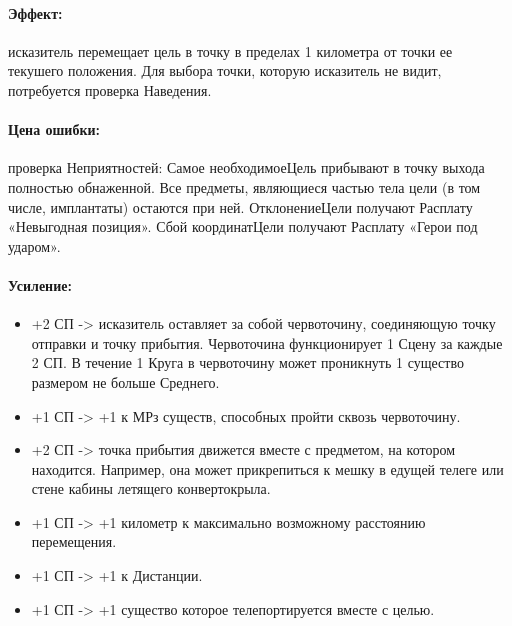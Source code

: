 \paragraph{Эффект: }исказитель перемещает цель в точку в пределах 1 километра от точки ее текушего положения. Для выбора точки, которую исказитель не видит, потребуется проверка Наведения.
\paragraph{Цена ошибки: }проверка Неприятностей: 
 {Самое необходимое}{Цель прибывают в точку выхода полностью обнаженной. Все предметы, являющиеся частью тела цели (в том числе, имплантаты) остаются при ней.} {Отклонение}{Цели получают Расплату «Невыгодная позиция».} {Сбой координат}{Цели получают Расплату «Герои под ударом».}
\paragraph{Усиление:}
\begin{itemize}
\item+2 СП -> исказитель оставляет за собой червоточину, соединяющую точку отправки и точку прибытия. 
\newline Червоточина функционирует 1 Сцену за каждые 2 СП. В течение 1 Круга в червоточину может проникнуть 1 существо размером не больше Среднего.
\item+1 СП -> +1 к МРз существ, способных пройти сквозь червоточину.
\item+2 СП -> точка прибытия движется вместе с предметом, на котором находится. Например, она может прикрепиться к мешку в едущей телеге или стене кабины летящего конвертокрыла.
\item+1 СП -> +1 километр к максимально возможному расстоянию перемещения.
\item+1 СП -> +1 к Дистанции.
\item+1 СП -> +1 существо которое телепортируется вместе с целью.
\end{itemize}

